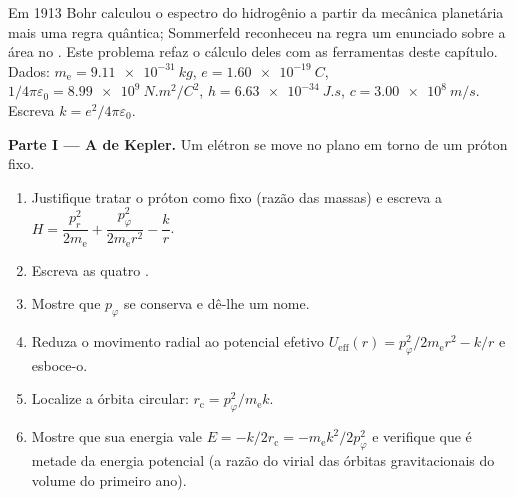 \begin{problem}\label{pb:b3:hamiltonian-mechanics:1}
Em 1913 Bohr calculou o espectro do hidrogênio a partir da mecânica
planetária mais uma regra quântica; Sommerfeld reconheceu na regra um
enunciado sobre a área no . Este problema refaz o
cálculo deles com as ferramentas deste capítulo. Dados: $m_{\text{e}} =
\qty{9.11e-31}{kg}$, $e = \qty{1.60e-19}{C}$, $1/4\pi\varepsilon_0 =
\qty{8.99e9}{N.m^2/C^2}$, $h = \qty{6.63e-34}{J.s}$, $c =
\qty{3.00e8}{m/s}$. Escreva $k = e^2/4\pi\varepsilon_0$.

\medskip\noindent\textbf{Parte I --- A  de Kepler.}
Um elétron se move no plano em torno de um próton fixo.
\begin{enumerate}
  \item Justifique tratar o próton como fixo (razão das massas) e
        escreva a  $H = \dfrac{p_r^2}{2m_{\text{e}}} +
        \dfrac{p_\varphi^2}{2m_{\text{e}}r^2} - \dfrac{k}{r}$.
  \item Escreva as quatro .
  \item Mostre que $p_\varphi$ se conserva e dê-lhe um nome.
  \item Reduza o movimento radial ao potencial efetivo
        $U_{\text{eff}}(r) = p_\varphi^2/2m_{\text{e}}r^2 - k/r$ e
        esboce-o.
  \item Localize a órbita circular: $r_{\text{c}} =
        p_\varphi^2/m_{\text{e}}k$.
  \item Mostre que sua energia vale $E = -k/2r_{\text{c}} =
        -m_{\text{e}}k^2/2p_\varphi^2$ e verifique que é metade da
        energia potencial (a razão do virial das órbitas
        gravitacionais do volume do primeiro ano).
\end{enumerate}


\end{problem}
